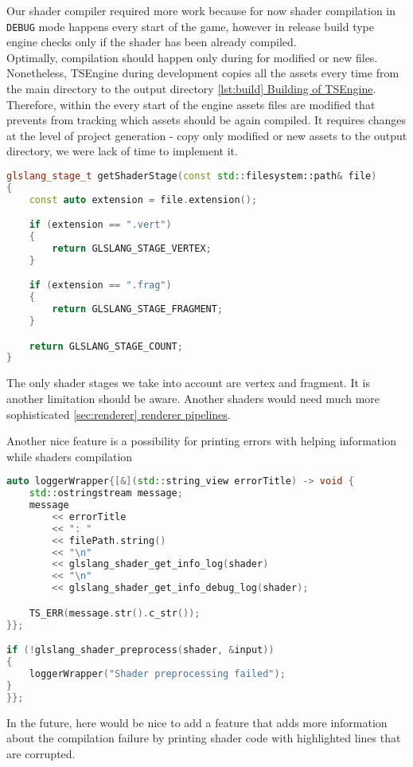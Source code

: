 \label{problem_with_shader_compilation}
Our shader compiler required more work because for now shader compilation in \texttt{DEBUG} mode happens every start of the game, however in release build type engine checks only if the shader has been already compiled.\\
Optimally, compilation should happen only during for modified or new files. Nonetheless, TSEngine during development copies all the assets every time from the main directory to the output directory  \hyperref[lst:build]{\ref*{lst:build} Building of TSEngine}. Therefore, within the every start of the engine assets files are modified that prevents from tracking which assets should be again compiled. It requires changes at the level of project generation - copy only modified or new assets to the output directory, we were lack of time to implement it.

\begin{lstlisting}[language=c++, caption=Shader Compiler supported shader stages (./engine/src/vulkan\_tools/shaders\_compiler.cpp)]
glslang_stage_t getShaderStage(const std::filesystem::path& file)
{
    const auto extension = file.extension();

    if (extension == ".vert")
    {
        return GLSLANG_STAGE_VERTEX;
    }

    if (extension == ".frag")
    {
        return GLSLANG_STAGE_FRAGMENT;
    }

    return GLSLANG_STAGE_COUNT;
}
\end{lstlisting}
The only shader stages we take into account are vertex and fragment. It is another limitation should be aware. Another shaders would need much more sophisticated \hyperref[sec:renderer]{\ref*{sec:renderer} renderer pipelines}.

Another nice feature is a possibility for printing errors with helping information while shaders compilation
\begin{lstlisting}[language=c++, caption=Shader Compiler logging (./engine/src/vulkan\_tools/shaders\_compiler.cpp)]
auto loggerWrapper{[&](std::string_view errorTitle) -> void {
    std::ostringstream message;
    message
        << errorTitle
        << ": "
        << filePath.string()
        << "\n"
        << glslang_shader_get_info_log(shader)
        << "\n"
        << glslang_shader_get_info_debug_log(shader);

    TS_ERR(message.str().c_str());
}};

if (!glslang_shader_preprocess(shader, &input))
{
    loggerWrapper("Shader preprocessing failed");
}
}};
\end{lstlisting}
In the future, here would be nice to add a feature that adds more information about the compilation failure by printing shader code with highlighted lines that are corrupted. 

